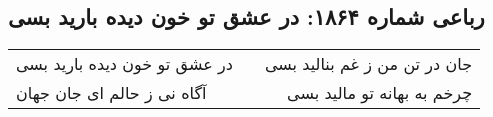 \begin{center}
\section*{رباعی شماره ۱۸۶۴: در عشق تو خون دیده بارید بسی}
\label{sec:1864}
\begin{longtable}{l p{0.5cm} r}
در عشق تو خون دیده بارید بسی
&&
جان در تن من ز غم بنالید بسی
\\
آگاه نی ز حالم ای جان جهان
&&
چرخم به بهانه تو مالید بسی
\\
\end{longtable}
\end{center}
